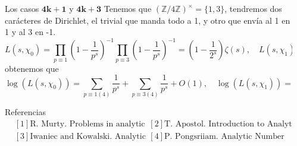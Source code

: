 \documentclass[final]{beamer}
\newcommand\Z{\ensuremath{\mathbb{Z}}}
\newlength{\sepwidth}
\newlength{\colwidth}
\newcommand{\separatorcolumn}{\begin{column}{\sepwidth}\end{column}}
\begin{document}
\begin{frame}[t,fragile]
\begin{columns}[t]
\begin{column}{\colwidth}
\begin{exampleblock}{Los casos $\mathbf{4k+1}$ y $\mathbf{4k+3}$}
    Tenemos que $(\Z/4\Z)^{\times}=\{1,3\}$, tendremos dos carácteres de Dirichlet, el trivial que manda todo a 1, y otro que envía al 1 en 1 y al 3 en -1.
    $$
L\left(s, \chi_0\right) =\prod_{p \equiv 1}\left(1-\frac{1}{p^s}\right)^{-1} \prod_{p \equiv 3}\left(1-\frac{1}{p^s}\right)^{-1}=\left(1-\frac{1}{2^s}\right) \zeta(s), \quad L\left(s, \chi_1\right)=\sum_{n=1}^{\infty} \frac{\chi_1(n)}{n^s}=\sum_{n=0}^{\infty}\frac{(-1)^n}{(2 n+1)^s},
$$
obtenemos que 
$$
\log \left(L\left(s, \chi_0\right)\right)=\sum_{p \equiv 1(4)} \frac{1}{p^s}+\sum_{p \equiv 3(4)} \frac{1}{p^s}+O(1), \quad 
\log \left(L\left(s, \chi_1\right)\right)=\sum_{p \equiv 1(4)} \frac{1}{p^s}-\sum_{p \equiv 3(4)} \frac{1}{p^s}+O(1)
$$
\end{exampleblock}

\begin{block}{Referencias}
\nocite{*}
\begin{align*}
    &[1] \text{R. Murty. Problems in analytic number theory} &&[2] \text{T. Apostol. Introduction to Analytic Number Theory.}\\
&[3]\text{Iwaniec and Kowalski. Analytic number theory.} &&[4]\text{P. Pongsriiam. Analytic Number Theory for Beginners.}
\end{align*}
\end{block}
\end{column}
\separatorcolumn



\end{columns}
\end{frame}
\end{document}
